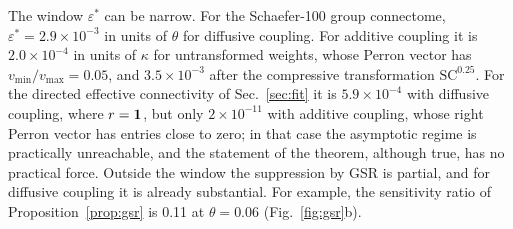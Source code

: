 The window $\varepsilon^*$ can be narrow. For the Schaefer-100 group connectome,
$\varepsilon^*=2.9\times10^{-3}$ in units of $\theta$ for diffusive coupling. For additive coupling it
is $2.0\times10^{-4}$ in units of $\kappa$ for untransformed weights, whose Perron vector has
$v_{\min}/v_{\max}=0.05$, and $3.5\times10^{-3}$ after the compressive transformation
$\mathrm{SC}^{0.25}$. For the directed effective connectivity of Sec.~\ref{sec:fit} it is $5.9\times10^{-4}$ with diffusive coupling, where $r=\mathbf 1$, but only $2\times10^{-11}$ with additive coupling, whose right Perron vector has entries close to zero; in that case the asymptotic regime is practically unreachable, and the statement of the theorem, although true, has no practical force. Outside the window the suppression by GSR is partial, and for diffusive coupling it is already substantial.
For example, the sensitivity ratio of Proposition~\ref{prop:gsr} is 0.11 at $\theta=0.06$
(Fig.~\ref{fig:gsr}b).
